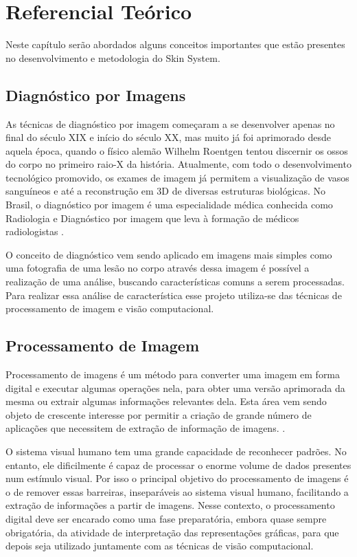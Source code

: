 \documentclass[openright]{ifrs} %
\begin{document}
\chapter{Referencial Teórico}
Neste capítulo serão abordados alguns conceitos importantes que estão presentes no desenvolvimento e metodologia do Skin System.


\section{Diagnóstico por Imagens}

As técnicas de diagnóstico por imagem começaram a se desenvolver apenas no final do século XIX e início do século XX, mas muito já foi aprimorado desde aquela época, quando o físico alemão Wilhelm Roentgen tentou discernir os ossos do corpo no primeiro raio-X da história. Atualmente, com todo o desenvolvimento tecnológico promovido, os exames de imagem já permitem a visualização de vasos sanguíneos e até a reconstrução em 3D de diversas estruturas biológicas.  No Brasil, o diagnóstico por imagem é uma especialidade médica conhecida como Radiologia e Diagnóstico por imagem que leva à formação de médicos radiologistas \cite{prando2015fundamentos}. 

O conceito de diagnóstico vem sendo aplicado em imagens mais simples como uma fotografia de uma lesão no corpo  através dessa imagem é possível a realização de uma análise, buscando características comuns a serem processadas. Para realizar essa análise de característica esse projeto utiliza-se das técnicas de processamento de imagem e visão computacional.


\section{Processamento de Imagem}
Processamento de imagens é um método para converter uma imagem em forma digital e executar algumas operações nela, para obter uma versão aprimorada da mesma ou extrair algumas informações relevantes dela. Esta área vem sendo objeto de crescente interesse por permitir a criação de grande número de aplicações que necessitem de extração de informação de imagens. \cite{marques1999processamento}.

O sistema visual humano tem uma grande capacidade de reconhecer padrões. No entanto, ele dificilmente é capaz de processar o enorme volume de dados presentes num estímulo visual. Por isso o principal objetivo do processamento de imagens é o de remover essas barreiras, inseparáveis ao sistema visual humano, facilitando a extração de informações a partir de imagens. Nesse contexto, o processamento digital deve ser encarado como uma fase preparatória, embora quase sempre obrigatória, da atividade de interpretação das representações gráficas, para que depois seja utilizado juntamente com as técnicas de visão computacional.
\end{document}
